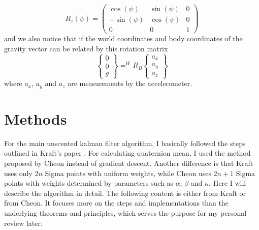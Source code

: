 \documentclass[twoside]{article}
\begin{document}
\begin{multicols}{2}
\begin{equation}
\end{equation}
\begin{equation}
R_z(\psi) = \left(\begin{array}{ccc} \cos\!\left(\psi{}\right) & \sin\!\left(\psi{}\right) & 0\\ - \sin\!\left(\psi{}\right) & \cos\!\left(\psi{}\right) & 0\\ 0 & 0 & 1 \end{array}\right)
\end{equation}
and we also notice that if the world coordinates and body coordinates of the gravity vector can be related by this rotation matrix
\begin{equation}
\begin{Bmatrix}0 \\ 0 \\ g\end{Bmatrix} = 
^WR_B \begin{Bmatrix}a_x \\ a_y \\ a_z\end{Bmatrix}
\end{equation}
where $a_x$, $a_y$ and $a_z$ are measurements by the accelerometer.

\section{Methods}
For the main unscented kalman filter algorithm, I basically followed the steps outlined in Kraft's paper \cite{Kraft03}. For calculating quaternion mean, I used the method proposed by Cheon \cite{Cheon07} instead of gradient descent. Another difference is that Kraft uses only $2n$ Sigma points with uniform weights, while Cheon uses $2n+1$ Sigma points with weights determined by parameters such as $\alpha$, $\beta$ and $\kappa$. Here I will describe the algorithm in detail. The following content is either from Kraft or from Cheon. It focuses more on the steps and implementations than the underlying theorems and principles, which serves the purpose for my personal review later.


\end{multicols}
\end{document}

